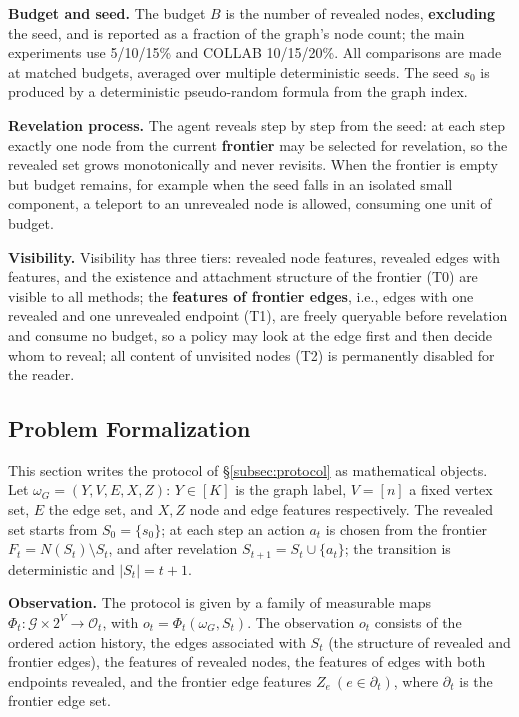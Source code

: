 \documentclass{article}
\begin{document}
\textbf{Budget and seed.} The budget $B$ is the number of revealed nodes, \textbf{excluding} the seed, and is reported as a fraction of the graph's node count; the main experiments use 5/10/15\% and COLLAB 10/15/20\%. All comparisons are made at matched budgets, averaged over multiple deterministic seeds. The seed $s_0$ is produced by a deterministic pseudo-random formula from the graph index.

\textbf{Revelation process.} The agent reveals step by step from the seed: at each step exactly one node from the current \textbf{frontier} may be selected for revelation, so the revealed set grows monotonically and never revisits. When the frontier is empty but budget remains, for example when the seed falls in an isolated small component, a teleport to an unrevealed node is allowed, consuming one unit of budget.

\textbf{Visibility.} Visibility has three tiers: revealed node features, revealed edges with features, and the existence and attachment structure of the frontier (T0) are visible to all methods; the \textbf{features of frontier edges}, i.e., edges with one revealed and one unrevealed endpoint (T1), are freely queryable before revelation and consume no budget, so a policy may look at the edge first and then decide whom to reveal; all content of unvisited nodes (T2) is permanently disabled for the reader.

\subsection{Problem Formalization}
\label{subsec:formal}

This section writes the protocol of \S\ref{subsec:protocol} as mathematical objects. Let $\omega_G=(Y,V,E,X,Z)$: $Y\in[K]$ is the graph label, $V=[n]$ a fixed vertex set, $E$ the edge set, and $X,Z$ node and edge features respectively. The revealed set starts from $S_0=\{s_0\}$; at each step an action $a_t$ is chosen from the frontier $F_t=N(S_t)\setminus S_t$, and after revelation $S_{t+1}=S_t\cup\{a_t\}$; the transition is deterministic and $|S_t|=t+1$.

\textbf{Observation.} The protocol is given by a family of measurable maps $\Phi_t:\mathcal G\times 2^V\to\mathcal O_t$, with $o_t=\Phi_t(\omega_G,S_t)$. The observation $o_t$ consists of the ordered action history, the edges associated with $S_t$ (the structure of revealed and frontier edges), the features of revealed nodes, the features of edges with both endpoints revealed, and the frontier edge features $Z_e\ (e\in\partial_t)$, where $\partial_t$ is the frontier edge set.
\end{document}
